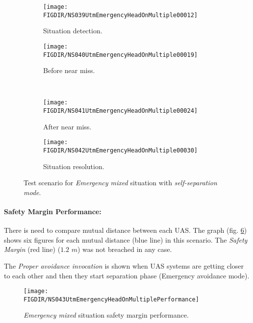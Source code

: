     \begin{figure}[H]
        \centering
        \begin{subfigure}{0.48\textwidth}
        	\centering
            \texttt{[image: \\FIGDIR/NS039UtmEmergencyHeadOnMultiple00012]}
            \caption{Situation detection.}
            \label{fig:emergencyMultipleSituationDetection}
        \end{subfigure}
        \begin{subfigure}{0.48\textwidth}
        	\centering
            \texttt{[image: \\FIGDIR/NS040UtmEmergencyHeadOnMultiple00019]} 
            \caption{Before near miss.}
            \label{fig:emergencyMultipleBeforeNearMiss}
        \end{subfigure}
        \\
        \begin{subfigure}{0.48\textwidth}
        	\centering
            \texttt{[image: \\FIGDIR/NS041UtmEmergencyHeadOnMultiple00024]} 
            \caption{After near miss.}
            \label{fig:emergencyMultipleAfterNearMiss}
        \end{subfigure}
        \begin{subfigure}{0.48\textwidth}
        	\centering
            \texttt{[image: \\FIGDIR/NS042UtmEmergencyHeadOnMultiple00030]} 
            \caption{Situation resolution.}
            \label{fig:emergencyMultipleSituationReslution}
        \end{subfigure}
        \caption{Test scenario for \emph{Emergency mixed} situation with \emph{self-separation mode}.}
        \label{fig:testCaseEmergencyMixed}
    \end{figure}
    
    \noindent\paragraph{Safety Margin Performance:} There is need to compare mutual distance between each UAS. The graph (fig. \ref{fig:testCaseMultipleAvoidancePerformance}) shows six figures for each mutual distance (blue line) in this scenario. The \emph{Safety Margin} (red line) ($1.2$ $m$) was not breached in any case. 
    
    The \emph{Proper avoidance invocation} is shown when UAS systems are getting closer to each other and then they start separation phase (Emergency avoidance mode).
            
    \begin{figure}[H]
        \centering
        \texttt{[image: \\FIGDIR/NS043UtmEmergencyHeadOnMultiplePerformance]} 
        \caption{\emph{Emergency mixed} situation safety margin performance.}
        \label{fig:testCaseMultipleAvoidancePerformance}
    \end{figure}
    
